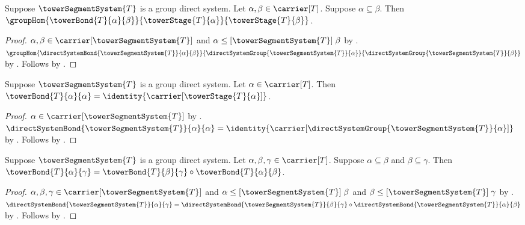 \begin{proposition}\label{tower_segment_system_bond_hom_bridge}
    Suppose $\towerSegmentSystem{T}$ is a group direct system.
    Let $\alpha,\beta\in\carrier[T]$.
    Suppose $\alpha\subseteq\beta$.
    Then $\groupHom{\towerBond{T}{\alpha}{\beta}}
        {\towerStage{T}{\alpha}}{\towerStage{T}{\beta}}$.
\end{proposition}
\begin{proof}
    $\alpha,\beta\in\carrier[\towerSegmentSystem{T}]$ and
        $\alpha\mathrel{\leq[\towerSegmentSystem{T}]}\beta$ by
        .
    $\groupHom{\directSystemBond{\towerSegmentSystem{T}}{\alpha}{\beta}}
        {\directSystemGroup{\towerSegmentSystem{T}}{\alpha}}
        {\directSystemGroup{\towerSegmentSystem{T}}{\beta}}$ by
        .
    Follows by
        .
\end{proof}

\begin{proposition}\label{tower_segment_system_bond_identity_bridge}
    Suppose $\towerSegmentSystem{T}$ is a group direct system.
    Let $\alpha\in\carrier[T]$.
    Then $\towerBond{T}{\alpha}{\alpha}=
        \identity{\carrier[\towerStage{T}{\alpha}]}$.
\end{proposition}
\begin{proof}
    $\alpha\in\carrier[\towerSegmentSystem{T}]$ by
        .
    $\directSystemBond{\towerSegmentSystem{T}}{\alpha}{\alpha}=
        \identity{\carrier[
            \directSystemGroup{\towerSegmentSystem{T}}{\alpha}]}$ by
        .
    Follows by
        .
\end{proof}

\begin{proposition}\label{tower_segment_system_bond_composition_bridge}
    Suppose $\towerSegmentSystem{T}$ is a group direct system.
    Let $\alpha,\beta,\gamma\in\carrier[T]$.
    Suppose $\alpha\subseteq\beta$ and $\beta\subseteq\gamma$.
    Then $\towerBond{T}{\alpha}{\gamma}=
        \towerBond{T}{\beta}{\gamma}\circ
            \towerBond{T}{\alpha}{\beta}$.
\end{proposition}
\begin{proof}
    $\alpha,\beta,\gamma\in\carrier[\towerSegmentSystem{T}]$ and
        $\alpha\mathrel{\leq[\towerSegmentSystem{T}]}\beta$ and
        $\beta\mathrel{\leq[\towerSegmentSystem{T}]}\gamma$ by
        .
    $\directSystemBond{\towerSegmentSystem{T}}{\alpha}{\gamma}=
        \directSystemBond{\towerSegmentSystem{T}}{\beta}{\gamma}\circ
            \directSystemBond{\towerSegmentSystem{T}}{\alpha}{\beta}$ by
        .
    Follows by .
\end{proof}


